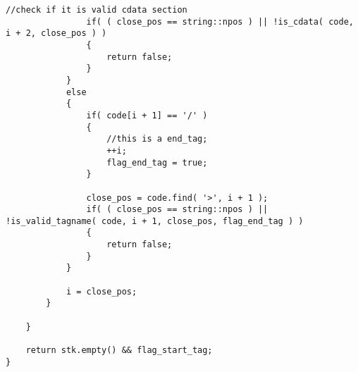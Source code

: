 \begin{lstlisting}[style=customc, caption={Stack}]
                //check if it is valid cdata section
                if( ( close_pos == string::npos ) || !is_cdata( code, i + 2, close_pos ) )
                {
                    return false;
                }
            }
            else
            {
                if( code[i + 1] == '/' )
                {
                    //this is a end_tag;
                    ++i;
                    flag_end_tag = true;
                }

                close_pos = code.find( '>', i + 1 );
                if( ( close_pos == string::npos ) || !is_valid_tagname( code, i + 1, close_pos, flag_end_tag ) )
                {
                    return false;
                }
            }

            i = close_pos;
        }

    }

    return stk.empty() && flag_start_tag;
}
\end{lstlisting}
